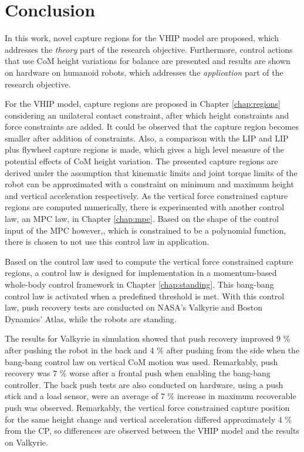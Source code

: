 %
\chapter{Conclusion}\label{chap:conclusion}
In this work, novel capture regions for the \ac{VHIP} model are proposed, which addresses the \textit{theory} part of the research objective. Furthermore, control actions that use \ac{CoM} height variations for balance are presented and results are shown on hardware on humanoid robots, which addresses the \textit{application} part of the research objective. 

For the \ac{VHIP} model, capture regions are proposed in Chapter \ref{chap:regions} considering an unilateral contact constraint, after which height constraints and force constraints are added. It could be observed that the capture region becomes smaller after addition of constraints. Also, a comparison with the \ac{LIP} and \ac{LIP} plus flywheel capture regions is made, which gives a high level measure of the potential effects of \ac{CoM} height variation. The presented capture regions are derived under the assumption that kinematic limits and joint torque limits of the robot can be approximated with a constraint on minimum and maximum height and vertical acceleration respectively. As the vertical force constrained capture regions are computed numerically, there is experimented with another control law, an \ac{MPC} law, in Chapter \ref{chap:mpc}. Based on the shape of the control input of the \ac{MPC} however,, which is constrained to be a polynomial function, there is chosen to not use this control law in application.

Based on the control law used to compute the vertical force constrained capture regions, a control law is designed for implementation in a momentum-based whole-body control framework in Chapter \ref{chap:standing}. This bang-bang control law is activated when a predefined threshold is met. With this control law, push recovery tests are conducted on NASA's Valkyrie and Boston Dynamics' Atlas, while the robots are standing. 

The results for Valkyrie in simulation showed that push recovery improved $9$ \% after pushing the robot in the back and $4$ \% after pushing from the side when the bang-bang control law on vertical \ac{CoM} motion was used. Remarkably, push recovery was $7$ \% worse after a frontal push when enabling the bang-bang controller. The back push tests are also conducted on hardware, using a push stick and a load sensor, were an average of $7$ \% increase in maximum recoverable push was observed. Remarkably, the vertical force constrained capture position for the same height change and vertical acceleration differed approximately $4$ \% from the \ac{CP}, so differences are observed between the \ac{VHIP} model and the results on Valkyrie.

